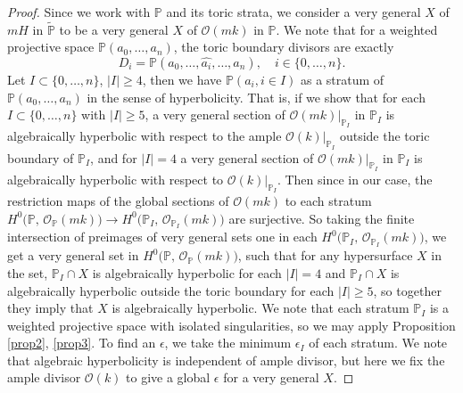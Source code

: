 \documentclass{amsart}
\theoremstyle{definition}
\theoremstyle{remark}
\begin{document}
\begin{proof}
Since we work with $\mathbb P$ and its toric strata, we consider a very general $X$ of $mH$ in $\widetilde{\mathbb P}$ to be a very general $X$ of $\mathcal O(mk)$ in $\mathbb P$. We note that for a weighted projective space $\mathbb{P}(a_0,\dots,a_n)$, the toric boundary divisors are exactly 
\[
D_i = \mathbb{P}(a_0,\dots,\widehat{a_i},\dots,a_n), \quad i \in \{0,\dots,n\}.
\] 
Let $I \subset \{0,\dots,n\}$, $|I|\geq 4$, then we have $\mathbb{P}(a_i, i \in I)$ as a stratum of $\mathbb{P}(a_0,\dots,a_n)$ in the sense of hyperbolicity. That is, if we show that for each $I \subset \{0,\dots,n\}$ with $|I|\geq 5$, a very general section of $\mathcal O(mk)|_{\mathbb{P}_I}$ in $\mathbb{P}_I$ is algebraically hyperbolic with respect to the ample $\mathcal O(k)|_{\mathbb{P}_I}$ outside the toric boundary of $\mathbb{P}_I$, and for $|I|=4$ a very general section of $\mathcal O(mk)|_{\mathbb{P}_I}$ in $\mathbb{P}_I$ is algebraically hyperbolic with respect to $\mathcal O(k)|_{\mathbb P_I}$. Then since in our case, the restriction maps of the global sections of $\mathcal O(mk)$ to each stratum $H^{0}\!\big(\mathbb{P},\, \mathcal{O}_{\mathbb{P}}(mk)\big)
\rightarrow
H^{0}\!\big(\mathbb{P}_{I},\, \mathcal{O}_{\mathbb{P}_{I}}(mk)\big)$ are surjective. So taking the finite intersection of preimages of very general sets one in each $H^{0}\!\big(\mathbb{P}_{I},\, \mathcal{O}_{\mathbb{P}_{I}}(mk)\big)$, we get a very general set in $H^{0}\!\big(\mathbb{P},\, \mathcal{O}_{\mathbb{P}}(mk)\big)$, such that for any hypersurface $X$ in the set, $\mathbb P_I \cap X$ is algebraically hyperbolic for each $|I| = 4$ and $\mathbb P_I \cap X$ is algebraically hyperbolic outside the toric boundary for each $|I| \geq 5$, so together they imply that $X$ is algebraically hyperbolic. We note that each stratum $\mathbb P_I$ is a weighted projective space with isolated singularities, so we may apply Proposition \ref{prop2}, \ref{prop3}. To find an $\epsilon$, we take the minimum $\epsilon_I$ of each stratum. We note that algebraic hyperbolicity is independent of ample divisor, but here we fix the ample divisor $\mathcal O(k)$ to give a global $\epsilon$ for a very general $X$. 


\end{proof}
\end{document}

